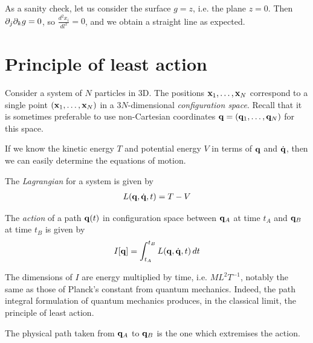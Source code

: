 \documentclass{../../template/note}
\begin{document}
    \begin{example*}
        As a sanity check, let us consider the surface $g = z$, i.e. the plane $z=0$. Then $\partial_j \partial_k g = 0$, so $\frac{d^2x_i}{dl^2} = 0$, and we obtain a straight line as expected.
    \end{example*}
    
    \section{Principle of least action}

    Consider a system of $N$ particles in 3D. The positions $\V x_1, \dots, \V x_N$ correspond to a single point $(\V x_1, \dots, \V x_N)$ in a $3N$-dimensional \emph{configuration space}. Recall that it is sometimes preferable to use non-Cartesian coordinates $\V q = (\V q_1, \dots, \V q_N)$ for this space. 

    If we know the kinetic energy $T$ and potential energy $V$ in terms of $\V q$ and $\dot{\V q}$, then we can easily determine the equations of motion.

    \begin{definition}[Lagrangian]
        The \emph{Lagrangian} for a system is given by
        \begin{align*}
            L(\V q, \dot{\V q}, t) = T-V
        \end{align*}
    \end{definition}
    
    \begin{definition}[Action]
        The \emph{action} of a path $\V q(t)$ in configuration space between $\V q_A$ at time $t_A$ and $\V q_B$ at time $t_B$ is given by
        \begin{align*}
            I[\V q] = \int_{t_A}^{t_B} L(\V q, \dot{\V q}, t) \D t
        \end{align*}
    \end{definition}
    
    \begin{remark*}
        The dimensions of $I$ are energy multiplied by time, i.e. $\si{ML^2 T^{-1}}$, notably the same as those of Planck's constant from quantum mechanics. Indeed, the path integral formulation of quantum mechanics produces, in the classical limit, the principle of least action.
    \end{remark*}
    
    \begin{proposition}
        The physical path taken from $\V q_A$ to $\V q_B$ is the one which extremises the action.
    \end{proposition}
    
\end{document}
